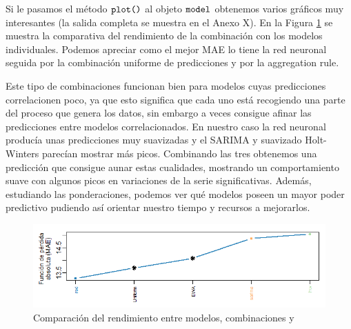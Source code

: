 Si le pasamos el método $\verb!plot()!$ al objeto $\verb!model!$ obtenemos varios gráficos muy interesantes (la salida completa se muestra en el Anexo X). En la Figura \ref{entre_modelos}  se muestra la comparativa del rendimiento de la combinación con los modelos individuales. Podemos apreciar como el mejor MAE lo tiene la red neuronal seguida por la combinación uniforme de predicciones y por la aggregation rule.

Este tipo de combinaciones funcionan bien para modelos cuyas predicciones correlacionen poco, ya que esto significa que cada uno está recogiendo una parte del proceso que genera los datos, sin embargo a veces consigue afinar las predicciones entre modelos correlacionados. En nuestro caso la red neuronal producía unas predicciones muy suavizadas y el SARIMA y suavizado Holt-Winters parecían mostrar más picos. Combinando las tres obtenemos una predicción que consigue aunar estas cualidades, mostrando un comportamiento suave con algunos picos en variaciones de la serie significativas. Además, estudiando las ponderaciones, podemos ver qué modelos poseen un mayor poder predictivo pudiendo así orientar nuestro tiempo y recursos a mejorarlos.
\begin{figure}
    \centering
    \centerline{\includegraphics[scale = 0.7]{Images/Modelizacion/339.png}}
    \caption{{Comparación del rendimiento entre modelos, combinaciones y }}
    \label{entre_modelos}
\end{figure}








